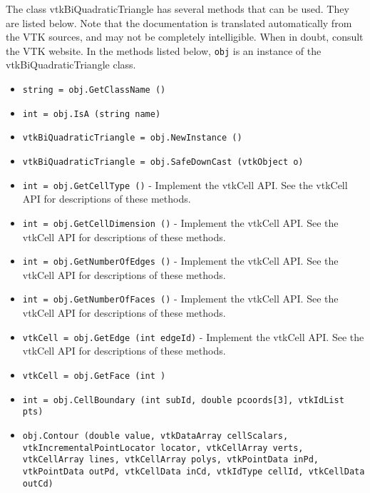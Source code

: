 The class vtkBiQuadraticTriangle has several methods that can be used.
  They are listed below.
Note that the documentation is translated automatically from the VTK sources,
and may not be completely intelligible.  When in doubt, consult the VTK website.
In the methods listed below, \verb|obj| is an instance of the vtkBiQuadraticTriangle class.
\begin{itemize}
\item  \verb|string = obj.GetClassName ()|

\item  \verb|int = obj.IsA (string name)|

\item  \verb|vtkBiQuadraticTriangle = obj.NewInstance ()|

\item  \verb|vtkBiQuadraticTriangle = obj.SafeDownCast (vtkObject o)|

\item  \verb|int = obj.GetCellType ()| -  Implement the vtkCell API. See the vtkCell API for descriptions
 of these methods.

\item  \verb|int = obj.GetCellDimension ()| -  Implement the vtkCell API. See the vtkCell API for descriptions
 of these methods.

\item  \verb|int = obj.GetNumberOfEdges ()| -  Implement the vtkCell API. See the vtkCell API for descriptions
 of these methods.

\item  \verb|int = obj.GetNumberOfFaces ()| -  Implement the vtkCell API. See the vtkCell API for descriptions
 of these methods.

\item  \verb|vtkCell = obj.GetEdge (int edgeId)| -  Implement the vtkCell API. See the vtkCell API for descriptions
 of these methods.

\item  \verb|vtkCell = obj.GetFace (int )|

\item  \verb|int = obj.CellBoundary (int subId, double pcoords[3], vtkIdList pts)|

\item  \verb|obj.Contour (double value, vtkDataArray cellScalars, vtkIncrementalPointLocator locator, vtkCellArray verts, vtkCellArray lines, vtkCellArray polys, vtkPointData inPd, vtkPointData outPd, vtkCellData inCd, vtkIdType cellId, vtkCellData outCd)|


\end{itemize}
